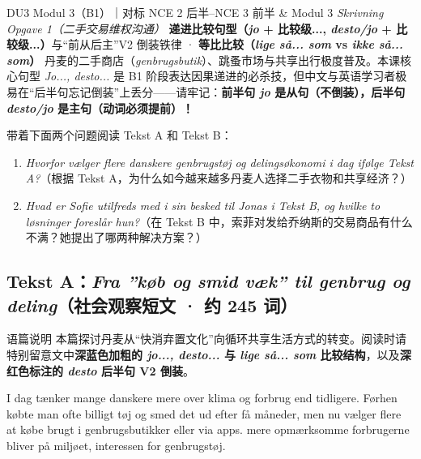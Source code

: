 {DU3 Modul 3（B1）｜对标 NCE 2 后半--NCE 3 前半 \& Modul 3 \textit{Skrivning Opgave 1（二手交易维权沟通）}}
{\textbf{递进比较句型（\textit{jo} + 比较级..., \textit{desto/jo} + 比较级...）}与“前从后主”V2 倒装铁律 · \textbf{等比比较（\textit{lige så... som} vs \textit{ikke så... som}）}}
{丹麦的二手商店（\textit{genbrugsbutik}）、跳蚤市场与共享出行极度普及。本课核心句型 \textit{Jo..., desto...} 是 B1 阶段表达因果递进的必杀技，但中文与英语学习者极易在“后半句忘记倒装”上丢分——请牢记：\textbf{前半句 \textit{jo} 是从句（不倒装），后半句 \textit{desto/jo} 是主句（动词必须提前）！}}

\begin{foerduleaeser}
带着下面两个问题阅读 Tekst A 和 Tekst B：
\begin{enumerate}
  \item \textit{Hvorfor vælger flere danskere genbrugstøj og delingsøkonomi i dag ifølge Tekst A?}（根据 Tekst A，为什么如今越来越多丹麦人选择二手衣物和共享经济？）
  \item \textit{Hvad er Sofie utilfreds med i sin besked til Jonas i Tekst B, og hvilke to løsninger foreslår hun?}（在 Tekst B 中，索菲对发给乔纳斯的交易商品有什么不满？她提出了哪两种解决方案？）
\end{enumerate}
\end{foerduleaeser}


\subsection*{Tekst A：\textit{Fra ”køb og smid væk” til genbrug og deling}（社会观察短文 · 约 245 词）}

\begin{tipbox}{语篇说明}
本篇探讨丹麦从“快消弃置文化”向循环共享生活方式的转变。阅读时请特别留意文中\textbf{\color{NCDNavy}深蓝色加粗的 \textit{jo..., desto...} 与 \textit{lige så... som} 比较结构}，以及\textbf{\color{NCDRed}深红色标注的 \textit{desto} 后半句 V2 倒装}。
\end{tipbox}

I dag tænker mange danskere mere over klima og forbrug end tidligere. Førhen købte man ofte billigt tøj og smed det ud efter få måneder, men nu vælger flere at købe brugt i genbrugsbutikker eller via apps.  mere opmærksomme forbrugerne bliver på miljøet,  interessen for genbrugstøj.

